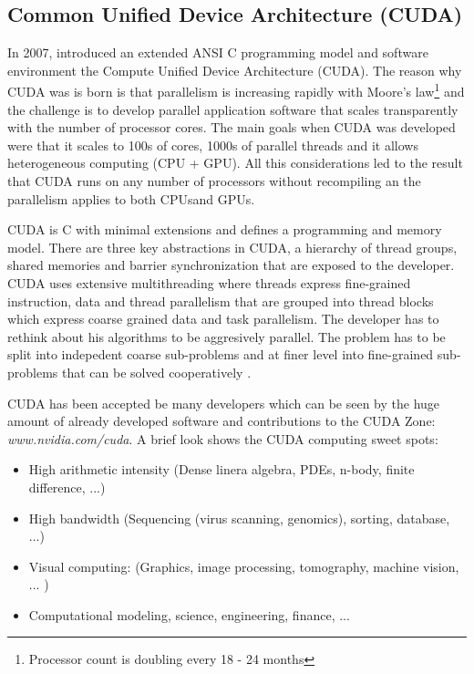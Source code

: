 \subsection*{Common Unified Device Architecture (CUDA)} %
\label{sub:common_unified_device_architecture_cuda_}
In 2007, {} introduced an extended ANSI C programming model and software
environment the Compute Unified Device Architecture (CUDA). The reason why CUDA
was is born is that parallelism is increasing rapidly with Moore's
law\footnote{Processor count is doubling every 18 - 24 months} and the challenge
is to develop parallel application software that scales transparently with the
number of processor cores. The main goals when \gls{CUDA} was developed were that it
scales to 100s of cores, 1000s of parallel threads and it allows heterogeneous
computing (CPU + GPU). All this considerations led to the result that \gls{CUDA} runs
on any number of processors without recompiling an the parallelism applies to
both \glspl{CPU}and \glspl{GPU}\citep{citeulike:3839013}.

CUDA is C with minimal extensions and defines a programming and memory model.
There are three key abstractions in CUDA, a hierarchy of thread groups, shared
memories and barrier synchronization \citep{citeulike:3325943} that are exposed
to the developer. \gls{CUDA} uses extensive multithreading where threads express
fine-grained instruction, data and thread parallelism that are grouped into
thread blocks which express coarse grained data and task parallelism. The
developer has to rethink about his algorithms to be aggresively parallel.
The problem has to be split into indepedent coarse sub-problems and at finer
level into fine-grained sub-problems that can be solved cooperatively
\citep{citeulike:3325943}.

CUDA has been accepted be many developers which can be seen by the huge amount
of already developed software and contributions to the \gls{CUDA} Zone:
\emph{www.nvidia.com/cuda}. A brief look shows the \gls{CUDA} computing sweet 
spots\citep{citeulike:3839013}: 
\begin{itemize} 
	\item High arithmetic intensity (Dense linera algebra, PDEs, n-body, 
			finite difference, ...) 
	\item High bandwidth (Sequencing (virus scanning, genomics), sorting, 			
			database, ...) 
	\item Visual computing: (Graphics, image processing, tomography, 
			machine vision, ... ) 
	\item Computational modeling, science, engineering, finance, ... 			
\end{itemize}

